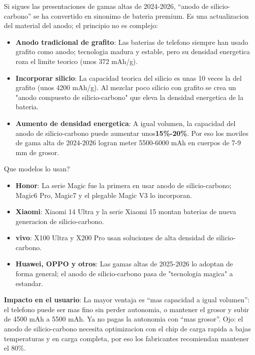 
Si sigues las presentaciones de gamas altas de 2024-2026, “anodo de silicio-carbono” se ha convertido en sinonimo de bateria premium. Es una actualizacion del material del anodo; el principio no es complejo:

\begin{itemize}
  \item \textbf{Anodo tradicional de grafito}: Las baterias de telefono siempre han usado grafito como anodo; tecnologia madura y estable, pero su densidad energetica roza el limite teorico (unos 372 mAh/g).
  \item \textbf{Incorporar silicio}: La capacidad teorica del silicio es unas 10 veces la del grafito (unos 4200 mAh/g). Al mezclar poco silicio con grafito se crea un "anodo compuesto de silicio-carbono" que eleva la densidad energetica de la bateria.
  \item \textbf{Aumento de densidad energetica}: A igual volumen, la capacidad del anodo de silicio-carbono puede aumentar unos\textbf{15\%-20\%}. Por eso los moviles de gama alta de 2024-2026 logran meter 5500-6000 mAh en cuerpos de 7-9 mm de grosor.
\end{itemize}

\begin{tcbinfo}{Que modelos lo usan?}
\begin{itemize}
  \item \textbf{Honor}: La serie Magic fue la primera en usar anodo de silicio-carbono; Magic6 Pro, Magic7 y el plegable Magic V3 lo incorporan.
  \item \textbf{Xiaomi}: Xiaomi 14 Ultra y la serie Xiaomi 15 montan baterias de nueva generacion de silicio-carbono.
  \item \textbf{vivo}: X100 Ultra y X200 Pro usan soluciones de alta densidad de silicio-carbono.
  \item \textbf{Huawei, OPPO y otros}: Las gamas altas de 2025-2026 lo adoptan de forma general; el anodo de silicio-carbono pasa de "tecnologia magica" a estandar.
\end{itemize}

\end{tcbinfo}

\textbf{Impacto en el usuario}: La mayor ventaja es “mas capacidad a igual volumen”: el telefono puede ser mas fino sin perder autonomia, o mantener el grosor y subir de 4500 mAh a 5500 mAh. Ya no pagas la autonomia con “mas grosor”. Ojo: el anodo de silicio-carbono necesita optimizacion con el chip de carga rapida a bajas temperaturas y en carga completa, por eso los fabricantes recomiendan mantener el 80\%.

